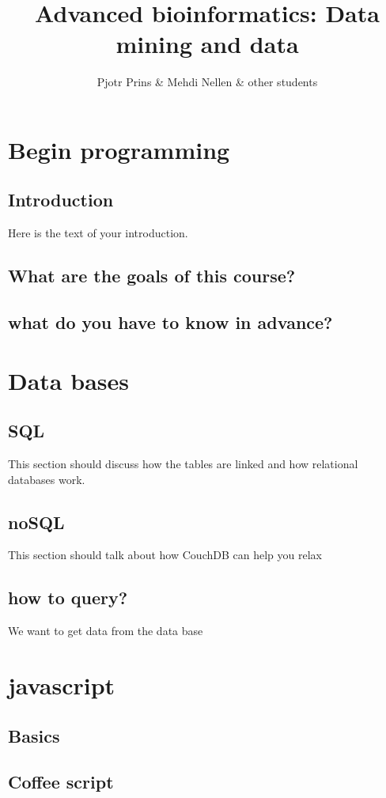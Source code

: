 \documentclass{book}
\begin{document}
\title{Advanced bioinformatics: Data mining and data}
\author{Pjotr Prins & Mehdi Nellen & other students}

\maketitle

\chapter{Begin programming}
     \section{Introduction}
     Here is the text of your introduction.
     \section{What are the goals of this course?}
     \section{what do you have to know in advance?}
     
     
\chapter{Data bases}
    \section{SQL}
    This section should discuss how the tables are linked and how relational databases work.
    \section{noSQL}
    This section should talk about how CouchDB can help you relax
    \section{how to query?}
    We want to get data from the data base
    
\chapter{javascript}
    \section{Basics}
    \section{Coffee script}
\end{document}
